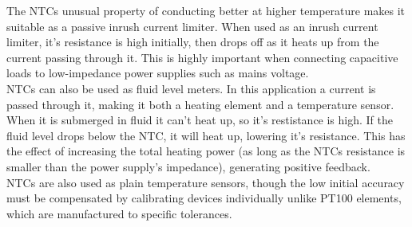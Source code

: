 The NTCs unusual property of conducting better at higher temperature makes it suitable as a passive inrush current limiter.
When used as an inrush current limiter, it's resistance is high initially, then drops off as it heats up from the current passing through it.
This is highly important when connecting capacitive loads to low-impedance power supplies such as mains voltage.\\
NTCs can also be used as fluid level meters.
In this application a current is passed through it, making it both a heating element and a temperature sensor.
When it is submerged in fluid it can't heat up, so it's restistance is high.
If the fluid level drops below the NTC, it will heat up, lowering it's resistance.
This has the effect of increasing the total heating power (as long as the NTCs resistance is smaller than the power supply's impedance), generating positive feedback.\\
NTCs are also used as plain temperature sensors, though the low initial accuracy must be compensated by calibrating devices individually unlike PT100 elements, which are manufactured to specific tolerances.
